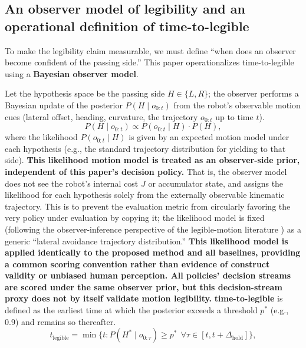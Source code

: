 \documentclass[11pt]{article}
\begin{document}
\FloatBarrier
\subsection{An observer model of legibility and an operational definition of time-to-legible}

To make the legibility claim measurable, we must define ``when does an observer become confident of the passing side.'' This paper operationalizes time-to-legible using a \textbf{Bayesian observer model}.

Let the hypothesis space be the passing side $H \in \{L, R\}$; the observer performs a Bayesian update of the posterior $P(H \mid o_{0:t})$ from the robot's observable motion cues (lateral offset, heading, curvature, the trajectory $o_{0:t}$ up to time $t$).
\begin{equation}
P(H \mid o_{0:t}) \propto P(o_{0:t} \mid H) \cdot P(H),
\end{equation}
where the likelihood $P(o_{0:t} \mid H)$ is given by an expected motion model under each hypothesis (e.g., the standard trajectory distribution for yielding to that side). \textbf{This likelihood motion model is treated as an observer-side prior, independent of this paper's decision policy.} That is, the observer model does not see the robot's internal cost $J$ or accumulator state, and assigns the likelihood for each hypothesis solely from the externally observable kinematic trajectory. This is to prevent the evaluation metric from circularly favoring the very policy under evaluation by copying it; the likelihood model is fixed (following the observer-inference perspective of the legible-motion literature \cite{dragan2013legibility}) as a generic ``lateral avoidance trajectory distribution.'' \textbf{This likelihood model is applied identically to the proposed method and all baselines, providing a common scoring convention rather than evidence of construct validity or unbiased human perception. All policies' decision streams are scored under the same observer prior, but this decision-stream proxy does not by itself validate motion legibility.} \textbf{time-to-legible} is defined as the earliest time at which the posterior exceeds a threshold $p^*$ (e.g., 0.9) and remains so thereafter.
\begin{equation}
t_{\text{legible}} = \min\{t : P(H^* \mid o_{0:\tau}) \ge p^* \ \ \forall \tau \in [t, t+\Delta_{\text{hold}}]\},
\end{equation}
\end{document}
